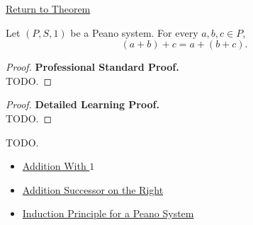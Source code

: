 \newpage
{}
\label{prf:addition-associative}

\begin{remark*}[Return]
\hyperref[thm:addition-associative]{Return to Theorem}
\end{remark*}

\begin{theorem*}
Let $(P,S,1)$ be a Peano system. For every $a,b,c \in P$,
\[
(a+b)+c=a+(b+c).
\]
\end{theorem*}

\begin{proof}
\textbf{Professional Standard Proof.}~\\
TODO.
\end{proof}

\begin{proof}
\textbf{Detailed Learning Proof.}~\\
TODO.
\end{proof}

\begin{remark*}
TODO.
\end{remark*}

\begin{dependencies}
\begin{itemize}
  \item \hyperref[thm:addition-with-one]{Addition With $1$}
  \item \hyperref[thm:addition-successor-on-right]{Addition Successor on the Right}
  \item \hyperref[thm:induction-principle-for-peano-system]{Induction Principle for a Peano System}
\end{itemize}
\end{dependencies}
